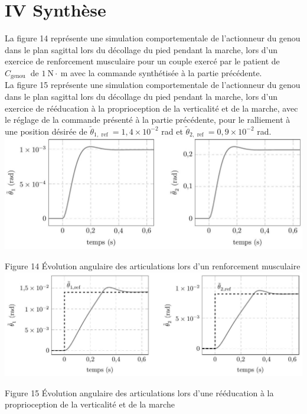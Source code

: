 \documentclass[10pt]{article}
\begin{document}
\section*{IV Synthèse}
La figure 14 représente une simulation comportementale de l'actionneur du genou dans le plan sagittal lors du décollage du pied pendant la marche, lors d'un exercice de renforcement musculaire pour un couple exercé par le patient de $C_{\text {genou }}$ de $1 \mathrm{~N} \cdot \mathrm{~m}$ avec la commande synthétisée à la partie précédente.\\
La figure 15 représente une simulation comportementale de l'actionneur du genou dans le plan sagittal lors du décollage du pied pendant la marche, lors d'un exercice de rééducation à la proprioception de la verticalité et de la marche, avec le réglage de la commande présenté à la partie précédente, pour le ralliement à une position désirée de $\tilde{\theta}_{1, \text { ref }}=1,4 \times 10^{-2}$ rad et $\tilde{\theta}_{2, \text { ref }}=0,9 \times 10^{-2}$ rad.\\
\includegraphics[max width=\textwidth, center]{2025_07_03_97545f5dc188959e5663g-12}

Figure 14 Évolution angulaire des articulations lors d'un renforcement musculaire\\
\includegraphics[max width=\textwidth, center]{2025_07_03_97545f5dc188959e5663g-12(1)}

Figure 15 Évolution angulaire des articulations lors d'une rééducation à la proprioception de la verticalité et de la marche
\end{document}
